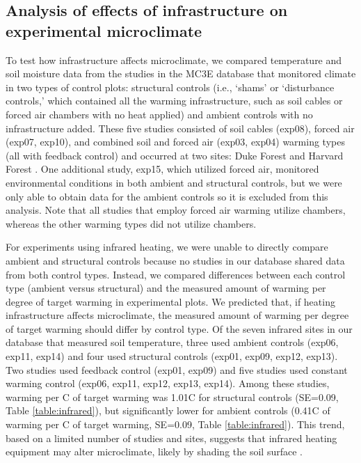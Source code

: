 \documentclass{article}
\begin{document}
\subsection* {Analysis of effects of infrastructure on experimental microclimate}
To test how infrastructure affects microclimate, we compared temperature and soil moisture data from the studies in the MC3E database that monitored climate in two types of control plots: structural controls (i.e., `shams' or `disturbance controls,' which contained all the warming infrastructure, such as soil cables or forced air chambers with no heat applied) and ambient controls with no infrastructure added. These five studies consisted of soil cables (exp08), forced air (exp07, exp10), and combined soil and forced air (exp03, exp04) warming types (all with feedback control) and occurred at two sites: Duke Forest and Harvard Forest \citep{farnsworth1995,clark2014a,marchin2015,pelini2011}. One additional study, exp15, which utilized forced air, monitored environmental conditions in both ambient and structural controls, but we were only able to obtain data for the ambient controls so it is excluded from this analysis. Note that all studies that employ forced air warming utilize chambers, whereas the other warming types did not utilize chambers.
\par For experiments using infrared heating, we were unable to directly compare ambient and structural controls because no studies in our database shared data from both control types. Instead, we compared differences between each control type (ambient versus structural) and the measured amount of warming per degree of target warming in experimental plots. We predicted that, if heating infrastructure affects microclimate, the measured amount of warming per degree of target warming should differ by control type. Of the seven infrared sites in our database that measured soil temperature, three used ambient controls (exp06, exp11, exp14) and four used structural controls (exp01, exp09, exp12, exp13). Two studies used feedback control (exp01, exp09) and five studies used constant warming control (exp06, exp11, exp12, exp13, exp14). Among these studies, warming per \degree C of target warming was 1.01\degree C for structural controls (SE=0.09, Table  \ref{table:infrared}), but significantly lower for ambient controls (0.41\degree C of warming per \degree C of target warming, SE=0.09, Table \ref{table:infrared}). This trend, based on a limited number of studies and sites, suggests that infrared heating equipment may alter microclimate, likely by shading the soil surface \citep{mcdaniel2014}.  
\end{document}
